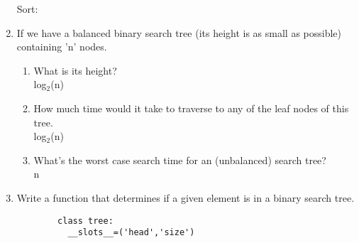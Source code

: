 \documentclass[11pt]{article}
\newenvironment{answer}{\large\lstset{basicstyle=\large}\color{white}}{}
\newenvironment{answer}{\large\lstset{basicstyle=\large}\color{red}}{}
\begin{document}
\begin{enumerate}
\begin{answer}
    	Sort:      \newline
    		[\underline{9}, 7, 5, 3, 3, 2, 1] \newline
    		[9, 7, 5, 3, 3, 2, 1] \newline
    \end{answer}

\item If we have a balanced binary search tree (its height is as small as
    possible) containing 'n' nodes.
        \begin{enumerate}
            \item What is its height? \\
                \begin{answer}
                log$_2$(n)
                \end{answer}
            \item How much time would it take to traverse to any of the leaf
            nodes of this tree. \\
                \begin{answer}
                log$_2$(n)
                \end{answer}
            \item What's the worst case search time for an (unbalanced) search
            tree? \\
                \begin{answer}
                n
                \end{answer}
                \pagebreak
        \end{enumerate}
    \item Write a function that determines if a given element is in a binary search tree.
        \begin{answer}
        \begin{lstlisting}
        class tree:
          __slots__=('head','size')
  

\end{lstlisting}
\end{answer}
\end{enumerate}
\end{document}
